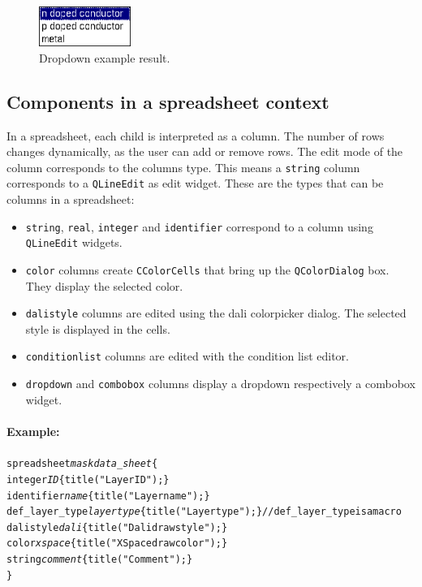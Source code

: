 \begin{figure}[h!] \begin{center}
\includegraphics[width=3cm]{./figures/ex_dropdown.eps}
\caption{Dropdown example result.}
\end{center} \end{figure}


%

\subsection{Components in a spreadsheet context}
In a spreadsheet, each child is interpreted as a column. The number of rows
changes dynamically, as the user can add or remove rows. The edit mode of the
column corresponds to the columns type. This means a
\verb=string= column corresponds to a \verb=QLineEdit= as edit widget. These
are the types that can be columns in a spreadsheet:
\begin{itemize}
\item \verb=string=, \verb=real=, \verb=integer= and \verb=identifier=
correspond to a column using \verb=QLineEdit= widgets.
\item \verb=color= columns create \verb=CColorCells= that bring up the \verb=QColorDialog= box. They display
the selected color.
\item \verb=dalistyle= columns are edited using the dali colorpicker dialog.
The selected style is displayed in the cells.
\item \verb=conditionlist= columns are edited with the condition list editor.
\item \verb=dropdown= and \verb=combobox= columns display a dropdown
respectively a combobox widget.
\end{itemize}

\paragraph{Example:}
\begin{alltt}
spreadsheet \emph{maskdata_sheet} \{
    integer             \emph{ID} \{ title("Layer ID"); \}
    identifier          \emph{name} \{ title("Layer name"); \}
    def_layer_type      \emph{layertype} \{ title("Layer type"); \} // def_layer_type is a macro
    dalistyle           \emph{dali} \{ title("Dali draw style"); \}
    color               \emph{xspace} \{ title("XSpace draw color"); \}
    string              \emph{comment} \{ title("Comment"); \}
\}
\end{alltt}

